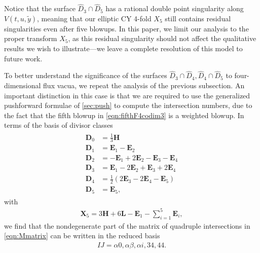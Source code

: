 \documentclass[11pt,oneside,english]{article}
\numberwithin{equation}{section}
\let\originalleft\left
\let\originalright\right
\renewcommand*{\left}{\mathopen{}\mathclose\bgroup\originalleft}
\renewcommand*{\right}{\aftergroup\egroup\originalright}
\theoremstyle{definition}
\begin{document}
Notice that the surface $\hat D_3  \cap \hat D_5$ has a rational double point singularity along $V(t , u ,\tilde y )$, meaning that our elliptic CY 4-fold $X_5$ still contains residual singularities even after five blowups. In this paper, we limit our analysis to the proper transform $X_5$, as this residual singularity should not affect the qualitative results we wish to illustrate---we leave a complete resolution of this model to future work.

To better understand the significance of the surfaces $\hat D_3 \cap \hat D_4,\hat D_4 \cap \hat D_5$ to four-dimensional flux vacua, we repeat the analysis of the previous subsection. An important distinction in this case is that we are required to use the generalized pushforward formulae of \cref{sec:push} to compute the intersection numbers, due to the fact that the fifth blowup in \cref{eqn:fifthF4codim3} is a weighted blowup. In terms of the basis of divisor classes
	\begin{align}
		\begin{split}
		\label{eqn:F4Dbasis}
			\boldsymbol D_0 &= \frac{1}{3} \boldsymbol H \\
			\boldsymbol  D_1 &= \boldsymbol E_1 - \boldsymbol E_2 \\
			\boldsymbol D_2 &= -\boldsymbol E_1 + 2 \boldsymbol E_2 - \boldsymbol E_3 - \boldsymbol E_4\\
			\boldsymbol D_3 &= \boldsymbol E_1 - 2 \boldsymbol E_2 + \boldsymbol E_3 + 2 \boldsymbol E_4 \\
			\boldsymbol D_4 &=\frac{1}{2} (2 \boldsymbol E_3 -2 \boldsymbol E_4 -\boldsymbol E_5) \\
			\boldsymbol D_5 & = \boldsymbol E_5,
		\end{split}
	\end{align}
with
	\begin{align}
		\boldsymbol{X}_5 = 3\boldsymbol{H} + 6\boldsymbol{L}- \boldsymbol{E}_1 - \sum_{i=1}^5 \boldsymbol{E}_i,
	\end{align}
we find that the nondegenerate part of the matrix of quadruple intersections in \cref{eqn:Mmatrix} can be written in the reduced basis 
\begin{align}
IJ = \alpha 0, \alpha \beta ,\alpha i, 34,44.
\end{align}
\end{document}
